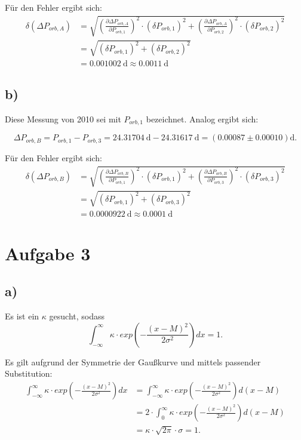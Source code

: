 \documentclass[titlepage]{scrartcl}
\begin{document}
Für den Fehler ergibt sich: 
\begin{align}
\delta (\Delta P_{orb,A}) &= \sqrt{(\frac{\partial \Delta P_{orb,A}}{\partial P_{orb, 1}})^2 \cdot (\delta P_{orb, 1})^2 + (\frac{\partial \Delta P_{orb,A}}{\partial P_{orb, 2}})^2 \cdot (\delta P_{orb, 2})^2} \nonumber\\&= \sqrt{(\delta P_{orb, 1})^2 + (\delta P_{orb, 2})^2} \nonumber\\&= 0.001002 \ \mathrm{d} \approx 0.0011\ \mathrm{d}
\end{align}

\subsection{b)}
Diese Messung von 2010 sei mit $P_{orb, 1}$ bezeichnet. 
Analog ergibt sich: 

\begin{equation}
\Delta P_{orb,B} = P_{orb, 1} - P_{orb, 3} = 24.31704\ \mathrm{d} - 24.31617 \ \mathrm{d} = (0.00087 \pm 0.00010) \mathrm{d}.
\end{equation}

Für den Fehler ergibt sich: 
\begin{align}
\delta (\Delta P_{orb,B}) &= \sqrt{(\frac{\partial \Delta P_{orb,B}}{\partial P_{orb, 1}})^2 \cdot (\delta P_{orb, 1})^2 + (\frac{\partial \Delta P_{orb,B}}{\partial P_{orb, 3}})^2 \cdot (\delta P_{orb, 3})^2} \nonumber\\&= \sqrt{(\delta P_{orb, 1})^2 + (\delta P_{orb, 3})^2} \nonumber\\&= 0.0000922\ \mathrm{d} \approx 0.0001 \ \mathrm{d}
\end{align}

\section{Aufgabe 3}
\subsection{a)}
Es ist ein $\kappa$ gesucht, sodass
\begin{equation}
\int_{-\infty}^{\infty} \kappa \cdot exp(-\frac{(x-M)^2}{2\sigma^2}) dx = 1.
\end{equation}

Es gilt aufgrund der Symmetrie der Gaußkurve und mittels passender Substitution:
\begin{align}
\int_{-\infty} ^{\infty} \kappa \cdot exp(-\frac{(x-M)^2}{2\sigma^2}) dx &= \int_{-\infty} ^{\infty} \kappa \cdot exp(-\frac{(x-M)^2}{2\sigma^2}) d(x-M) \nonumber\\&= 2 \cdot \int_{0} ^{\infty} \kappa \cdot exp(-\frac{(x-M)^2}{2\sigma^2}) d(x-M) \nonumber\\&= \kappa \cdot \sqrt {2\pi} \cdot \sigma = 1. 
\end{align}
\end{document}
